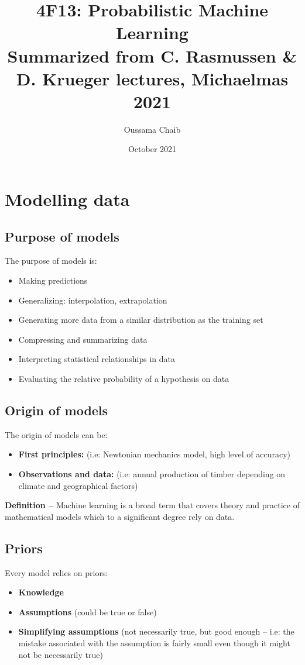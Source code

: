 \documentclass[a4paper,11pt]{article}
\title{%
	4F13: Probabilistic Machine Learning \\
	\vspace{10pt}
	\small Summarized from C. Rasmussen \& D. Krueger lectures, Michaelmas 2021}
\author{\small Oussama Chaib}
\date{\small October 2021}
\begin{document}
	\maketitle
	\tableofcontents
	\pagebreak
	\section{Modelling data}
	\subsection{Purpose of models}
	The purpose of models is:
	\begin{itemize}
		\item Making predictions
		\item Generalizing: interpolation, extrapolation
		\item Generating more data from a similar distribution as the training set
		\item Compressing and summarizing data
		\item Interpreting statistical relationships in data
		\item Evaluating the relative probability of a hypothesis on data
	\end{itemize}
	\subsection{Origin of models}
	The origin of models can be:
	\begin{itemize}
		\item \textbf{First principles:}  (i.e: Newtonian mechanics model, high level of accuracy)
		\item \textbf{Observations and data:} (i.e: annual production of timber depending on climate and geographical factors)
	\end{itemize}
	\textbf{Definition --} Machine learning is a broad term that covers theory and practice of mathematical models which to a significant degree rely on data.
	\subsection{Priors}
	Every model relies on priors: 
	\begin{itemize}
		\item \textbf{Knowledge}
		\item \textbf{Assumptions} (could be true or false)
		\item \textbf{Simplifying assumptions} (not necessarily true, but good enough -- i.e:  the mistake associated with the assumption is fairly small even though it might not be necessarily true)
	\end{itemize}
\end{document}
